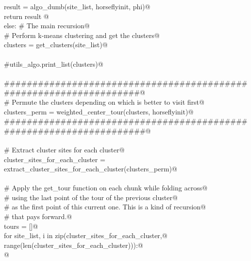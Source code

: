 \documentclass[11.5pt]{report}
\begin{document}
\begin{flushleft}
\begin{list}{}{}
\mbox{}\verb@              result = algo_dumb(site_list, horseflyinit, phi)@\\
\mbox{}\verb@              return result @\\
\mbox{}\verb@        else: # The main recursion@\\
\mbox{}\verb@           # Perform k-means clustering and get the clusters@\\
\mbox{}\verb@           clusters = get_clusters(site_list)@\\
\mbox{}\verb@@\\
\mbox{}\verb@           #utils_algo.print_list(clusters)@\\
\mbox{}\verb@@\\
\mbox{}\verb@           ###################################################################@\\
\mbox{}\verb@           # Permute the clusters depending on which is better to visit first@\\
\mbox{}\verb@           clusters_perm = weighted_center_tour(clusters, horseflyinit)@\\
\mbox{}\verb@           ####################################################################@\\
\mbox{}\verb@@\\
\mbox{}\verb@           # Extract cluster sites for each cluster@\\
\mbox{}\verb@           cluster_sites_for_each_cluster  = \@\\
\mbox{}\verb@                  extract_cluster_sites_for_each_cluster(clusters_perm)@\\
\mbox{}\verb@@\\
\mbox{}\verb@           # Apply the get_tour function on each chunk while folding across@\\
\mbox{}\verb@           # using the last point of the tour of the previous cluster@\\
\mbox{}\verb@           # as the first point of this current one. This is a kind of recursion@\\
\mbox{}\verb@           # that pays forward.@\\
\mbox{}\verb@           tours = []@\\
\mbox{}\verb@           for site_list, i in zip(cluster_sites_for_each_cluster,@\\
\mbox{}\verb@                                   range(len(cluster_sites_for_each_cluster))):@\\
\mbox{}\verb@                 @\\

\end{list}
\end{flushleft}
\end{document}
